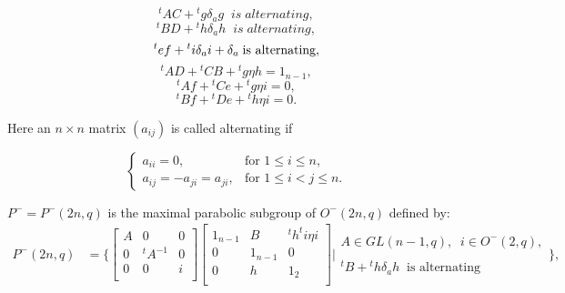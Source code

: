 \documentclass[a4,12pt]{elsart}
\begin{document}
\begin{equation*}
{}^t A C+{}^t g \delta_a g \;\; is \; alternating,
\end{equation*}
\begin{equation*}
{}^t B D+{}^t h \delta_a h \;\;is \;alternating,
\end{equation*}
\begin{equation}\label{a12}
 {}^t e f+{}^t i \delta_a i+\delta_a \; \textmd{is alternating},
\end{equation}
\begin{equation*}
{}^t A D+{}^t C B+{}^t g \eta h=1_{n-1},
\end{equation*}
\begin{equation*}
{}^t A f+{}^t C e+{}^t g \eta i=0,
\end{equation*}
\begin{equation*}
{}^t B f+{}^t D e+{}^t h \eta i=0.
\end{equation*}

Here an $n \times n$ matrix $(a_{ij})$ is called alternating if

\begin{equation*}
\begin{cases}
 a_{ii}=0,              & \text{for $1 \leq i \leq n$},\\
 a_{ij}= -a_{ji}=a_{ji}, & \text{for $1 \leq i < j \leq n$.}
\end{cases}
\end{equation*}

$P^-=P^-(2n,q)$ is the maximal parabolic subgroup of
$O^{-}(2n,q)$ defined by:\\

\begin{align*}
P^{-}(2n,q)&=
\bigg\{ \left[\begin{smallmatrix}
  A & 0 & 0 \\
  0 & {}^{t}A^{-1} & 0 \\
  0 & 0 &i \\
\end{smallmatrix}\right]
\left[\begin{smallmatrix}
  1_{n-1} & B       & {}^{t}h^{t}i \eta i \\
  0       & 1_{n-1} & 0 \\
  0       & h       & 1_{2} \\
\end{smallmatrix}\right] \bigg| \substack{ A \in GL(n-1,q),\;\; i \in O^{-}(2,q),\\
\\
{}^{t}B+{}^{t}h \delta_{a}h \;\; \textrm{is alternating}}\bigg\},
\end{align*}
\end{document}
